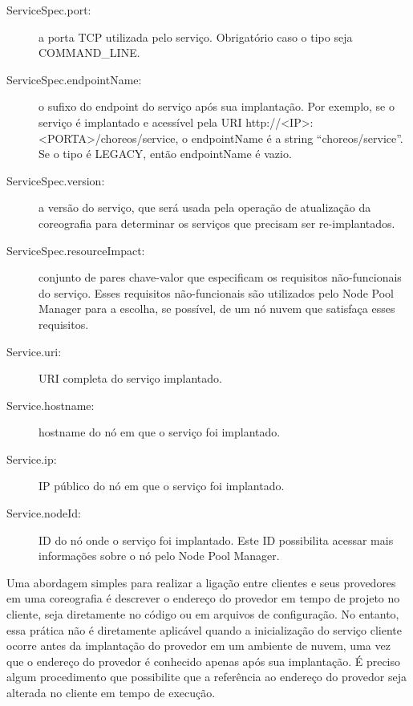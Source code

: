 \begin{description}
\item [ServiceSpec.port:] a porta TCP utilizada pelo serviço. Obrigatório caso o tipo seja COMMAND\_LINE.

\item [ServiceSpec.endpointName:] o sufixo do endpoint do serviço após sua implantação. Por exemplo, se o serviço é implantado e acessível pela URI http://<IP>:<PORTA>/choreos/service, o endpointName é a string ``choreos/service''. Se o tipo é LEGACY, então endpointName é vazio.

\item [ServiceSpec.version:] a versão do serviço, que será usada pela operação de atualização da coreografia para determinar os serviços que precisam ser re-implantados.

\item [ServiceSpec.resourceImpact:] conjunto de pares chave-valor que especificam os requisitos não-funcionais do serviço. Esses requisitos não-funcionais são utilizados pelo Node Pool Manager para a escolha, se possível, de um nó nuvem que satisfaça esses requisitos.

\item [Service.uri:] URI completa do serviço implantado.

\item [Service.hostname:] hostname do nó em que o serviço foi implantado.

\item [Service.ip:] IP público do nó em que o serviço foi implantado.

\item [Service.nodeId:] ID do nó onde o serviço foi implantado. Este ID possibilita acessar mais informações sobre o nó pelo Node Pool Manager. 

\end{description}

Uma abordagem simples para realizar a ligação entre clientes e seus provedores em uma coreografia é descrever o endereço do provedor em tempo de projeto no cliente, seja diretamente no código ou em arquivos de configuração. No entanto, essa prática não é diretamente aplicável quando a inicialização do serviço cliente ocorre antes da implantação do provedor em um ambiente de nuvem, uma vez que o endereço do provedor é conhecido apenas após sua implantação. É preciso algum procedimento que possibilite que a referência ao endereço do provedor seja alterada no cliente em tempo de execução.

